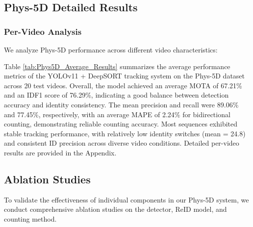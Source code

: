 \subsection{Phys-5D Detailed Results}

\subsubsection{Per-Video Analysis}
We analyze Phys-5D performance across different video characteristics:

\begin{table}[h]
\centering
{}
\caption{Phys-5D Average Performance Results (Detailed per-video results are provided in Appendix)}
\label{tab:Phys5D_Average_Results}
\end{table}

Table \ref{tab:Phys5D_Average_Results} summarizes the average performance metrics of the YOLOv11 + DeepSORT tracking system on the Phys-5D dataset across 20 test videos. Overall, the model achieved an average MOTA of 67.21\% and an IDF1 score of 76.29\%, indicating a good balance between detection accuracy and identity consistency. 
The mean precision and recall were 89.06\% and 77.45\%, respectively, with an average MAPE of 2.24\% for bidirectional counting, demonstrating reliable counting accuracy. Most sequences exhibited stable tracking performance, with relatively low identity switches (mean = 24.8) and consistent ID precision across diverse video conditions. Detailed per-video results are provided in the Appendix.

\subsection{Ablation Studies}

To validate the effectiveness of individual components in our Phys-5D system, we conduct comprehensive ablation studies on the detector, ReID model, and counting method.

